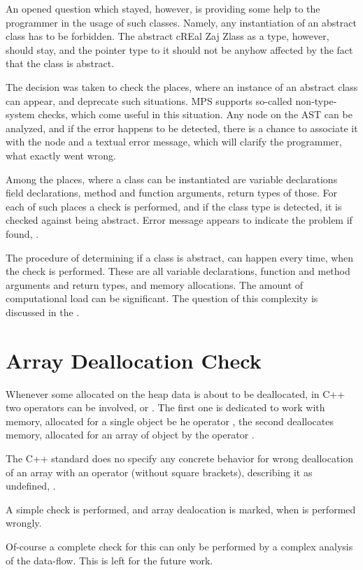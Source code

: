
An opened question which stayed, however, is providing some help to the programmer in the usage of such classes. Namely, any instantiation
of an abstract class has to be forbidden. The abstract cREal Zaj Zlass as a type, however, should stay, and the pointer type to it should not
be anyhow affected by the fact that the class is abstract.

The decision was taken to check the places, where an instance of an abstract class can appear, and deprecate such situations.
MPS supports so-called non-type-system checks, which come useful in this situation. Any node on the AST can be analyzed, and 
if the error happens to be detected, there is a chance to associate it with the node and a textual error message, which will
clarify the programmer, what exactly went wrong. 

Among the places, where a class can be instantiated are variable declarations field declarations, method and function arguments,
return types of those. For each of such places a check is performed, and if the class type is detected, it is checked against
being abstract. Error message appears to indicate the problem if found, . 

The procedure of determining if a class is abstract, can happen every time, when the check is performed. These are all 
variable declarations, function and method arguments and return types, and memory allocations. The amount of computational
load can be significant. The question of this complexity is discussed in the .


\section{Array Deallocation Check}
Whenever some allocated on the heap data is about to be deallocated, in C++ two operators can
be involved,  or . The first one is dedicated to work with memory, allocated
for a single object be he operator , the second deallocates memory, allocated for an array
of object by the operator .

The C++ standard does no specify any concrete behavior for wrong deallocation of an array with 
an operator  (without square brackets), describing it as undefined, \cite{cpp11}.

A simple check is performed, and array dealocation is marked, when is performed wrongly. 

Of-course a complete check for this can only be performed by a complex analysis of the data-flow.
This is left for the future work.


